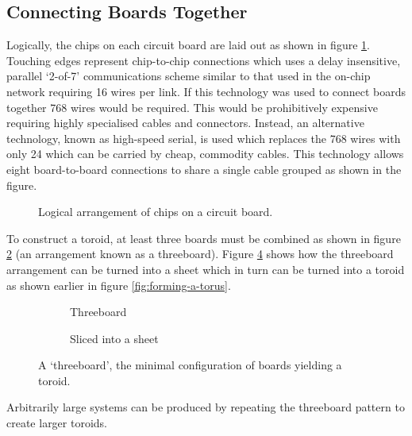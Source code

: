 		\subsection{Connecting Boards Together}
			
			Logically, the chips on each circuit board are laid out as shown in figure
			\ref{fig:chipsOnBoard}. Touching edges represent chip-to-chip connections
			which uses a delay insensitive, parallel `2-of-7' communications scheme
			similar to that used in the on-chip network requiring 16 wires per link.
			If this technology was used to connect boards together 768 wires would be
			required.  This would be prohibitively expensive requiring highly
			specialised cables and connectors. Instead, an alternative technology,
			known as high-speed serial, is used which replaces the 768 wires with only
			24 which can be carried by cheap, commodity cables. This technology allows
			eight board-to-board connections to share a single cable grouped as shown in
			the figure.
			
			\begin{figure}
				\center
				
				\caption{Logical arrangement of chips on a circuit board.}
				\label{fig:chipsOnBoard}
			\end{figure}
			
			To construct a toroid, at least three boards must be combined as shown in
			figure \ref{fig:threeboard} (an arrangement known as a threeboard).
			Figure \ref{fig:threeboardSliced} shows how the threeboard arrangement can
			be turned into a sheet which in turn can be turned into a toroid as shown
			earlier in figure \ref{fig:forming-a-torus}.
			
			\begin{figure}
				\begin{subfigure}[b]{0.45\textwidth}
					\center
					
					\caption{Threeboard}
					\label{fig:threeboard}
				\end{subfigure}
				\begin{subfigure}[b]{0.45\textwidth}
					\center
					
					\caption{Sliced into a sheet}
					\label{fig:threeboardSliced}
				\end{subfigure}
				
				\caption[A `threeboard'.]{A `threeboard', the minimal configuration of
				boards yielding a toroid.}
			\end{figure}
			
			Arbitrarily large systems can be produced by repeating the threeboard
			pattern to create larger toroids.
	
